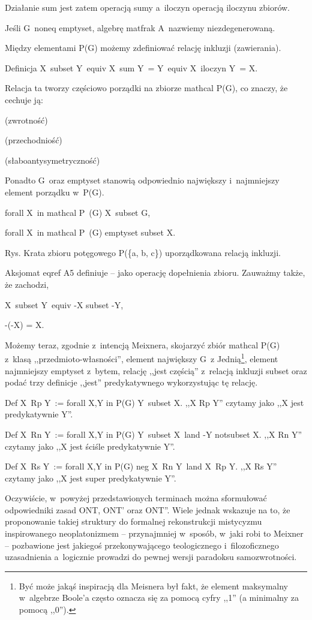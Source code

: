 Działanie sum jest zatem operacją sumy a~iloczyn operacją iloczynu zbiorów.

Jeśli G~noneq emptyset, algebrę matfrak A~nazwiemy niezdegenerowaną.

Między elementami P(G) możemy zdefiniować relację inkluzji (zawierania).

Definicja X~subset Y~equiv X~sum Y~= Y~equiv X~iloczyn Y~= X.

Relacja ta tworzy częściowo porządki na zbiorze mathcal P(G), co znaczy, że cechuje ją:

(zwrotność)

(przechodniość)

(słaboantysymetryczność)

Ponadto G~oraz emptyset stanowią odpowiednio największy i~najmniejszy element porządku w~P(G).

forall X~in mathcal P~(G) X~subset G,

forall X~in mathcal P~(G) emptyset subset X.

Rys. Krata zbioru potęgowego P(\{a, b, c\}) uporządkowana relacją inkluzji.

Aksjomat eqref A5 definiuje -- jako operację dopełnienia zbioru. Zauważmy także, że zachodzi,

X~subset Y~equiv -X subset -Y,

{}-(-X) = X.

Możemy teraz, zgodnie z~intencją Meixnera, skojarzyć zbiór mathcal P(G) z~klasą ,,przedmioto-własności'', element największy G~z Jednią\footnote{Być może jakąś inspiracją dla Meisnera był fakt, że element maksymalny w~algebrze Boole'a często oznacza się za pomocą cyfry ,,1'' (a minimalny za pomocą ,,0'').}, element najmniejszy emptyset z~bytem, relację ,,jest częścią'' z~relacją inkluzji subset oraz podać trzy definicje ,,jest'' predykatywnego wykorzystując tę relację.

Def X~Rp Y~:= forall X,Y in P(G) Y~subset X. ,,X Rp Y'' czytamy jako ,,X jest predykatywnie Y''.

Def X~Rn Y~:= forall X,Y in P(G) Y~subset X~land -Y notsubset X. ,,X Rn Y'' czytamy jako ,,X jest ściśle predykatywnie Y''.

Def X~Rs Y~:= forall X,Y in P(G) neg X~Rn Y~land X~Rp Y. ,,X Rs Y'' czytamy jako ,,X jest super predykatywnie Y''.

Oczywiście, w~powyżej przedstawionych terminach można sformułować odpowiedniki zasad ONT, ONT' oraz ONT''. Wiele jednak wskazuje na to, że proponowanie takiej struktury do formalnej rekonstrukcji mistycyzmu inspirowanego neoplatonizmem -- przynajmniej w~sposób, w~jaki robi to Meixner -- pozbawione jest jakiegoś przekonywającego teologicznego i~filozoficznego uzasadnienia a~logicznie prowadzi do pewnej wersji paradoksu samozwrotności.

